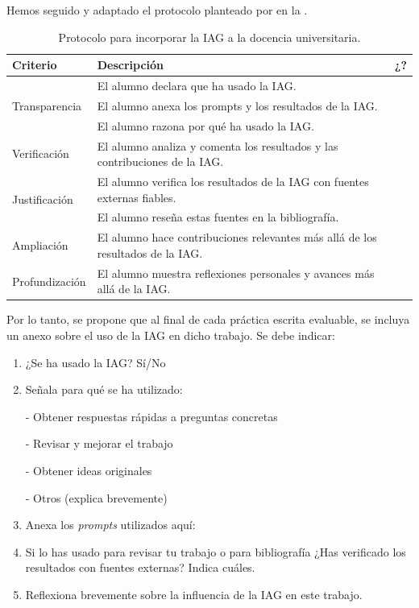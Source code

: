 \documentclass[spanish]{textolivre}
\begin{document}
Hemos seguido y adaptado el protocolo planteado por \textcite{Cassany2024} en la .

\begin{table}[htbp]
\centering
\begin{threeparttable}
\caption{Protocolo para incorporar la IAG a la docencia universitaria.}
\label{tab1}
\begin{tabularx}{\textwidth}{@{}lXc@{}}
\toprule
\textbf{Criterio} & \textbf{Descripción} & \textbf{¿?} \\
\midrule
\multirow{3}{*}{Transparencia}
& El alumno declara que ha usado la IAG. & \\
& El alumno anexa los prompts y los resultados de la IAG. & \\
& El alumno razona por qué ha usado la IAG. & \\
\midrule
Verificación
& El alumno analiza y comenta los resultados y las contribuciones de la IAG. & \\
\midrule
\multirow{2}{*}{Justificación}
& El alumno verifica los resultados de la IAG con fuentes externas fiables. & \\
& El alumno reseña estas fuentes en la bibliografía. & \\
\midrule
Ampliación
& El alumno hace contribuciones relevantes más allá de los resultados de la IAG. & \\
\midrule
Profundización
& El alumno muestra reflexiones personales y avances más allá de la IAG. & \\
\bottomrule
\end{tabularx}
\end{threeparttable}
\end{table}

Por lo tanto, se propone que al final de cada práctica escrita evaluable, se incluya un anexo sobre el uso de la IAG en dicho trabajo. Se debe indicar:

\begin{enumerate}
    \item ¿Se ha usado la IAG? Sí/No
    \item Señala para qué se ha utilizado:
    
    - Obtener respuestas rápidas a preguntas concretas
    
    - Revisar y mejorar el trabajo
    
    - Obtener ideas originales
    
    - Otros (explica brevemente)
    
    \item Anexa los \textit{prompts} utilizados aquí:
    \item Si lo has usado para revisar tu trabajo o para bibliografía ¿Has verificado los resultados con fuentes externas? Indica cuáles.
    \item Reflexiona brevemente sobre la influencia de la IAG en este trabajo.
\end{enumerate}
\end{document}
